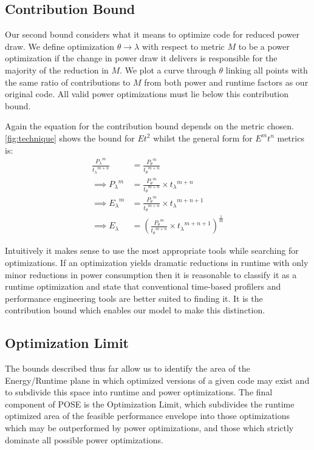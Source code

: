 \subsection{Contribution Bound}
Our second bound considers what it means to optimize code for reduced power draw. 
We define optimization $\theta \to \lambda$ with respect to metric $M$ to be a power optimization if the change in power draw it delivers is responsible for the majority of the reduction in $M$. We plot a curve through $\theta$ linking all points with the same ratio of contributions to $M$ from both power and runtime factors as our original code. All valid power optimizations must lie below this contribution bound. 

Again the equation for the contribution bound depends on the metric chosen. 
\autoref{fig:technique} shows the bound for $Et^2$ whilst the general form for $E^mt^n$ metrics is:
\begin{align}
\frac{{P_{\lambda}}^m}{{t_{\lambda}}^{m+n}} &= \frac{{P_{\theta}}^m}{{t_{\theta}}^{m+n}} \nonumber \\
\implies {P_{\lambda}}^m &= \frac{{P_{\theta}}^m}{{t_{\theta}}^{m+n}} \times {t_\lambda}^{m+n} \nonumber \\ 
\implies {E_{\lambda}}^m &= \frac{{P_{\theta}}^m}{{t_{\theta}}^{m+n}} \times {t_\lambda}^{m+n+1} \nonumber \\ 
\implies E_{\lambda} &= (\frac{{P_{\theta}}^m}{{t_{\theta}}^{m+n}} \times {t_\lambda}^{m+n+1})^{\frac{1}{m}} 
\end{align}

Intuitively it makes sense to use the most appropriate tools while searching for optimizations.  If an optimization yields dramatic reductions in runtime with only minor reductions in power consumption then it is reasonable to classify it as a runtime optimization and state that conventional time-based profilers and performance engineering tools are better suited to finding it. It is the contribution bound which enables our model to make this distinction.
\subsection{Optimization Limit}
The bounds described thus far allow us to identify the area of the Energy/Runtime plane in which optimized versions of a given code may exist and to subdivide this space into runtime and power optimizations. The final component of POSE is the Optimization Limit, which subdivides the runtime optimized area of the feasible performance envelope into those optimizations which may be outperformed by power optimizations, and those which strictly dominate all possible power optimizations.

